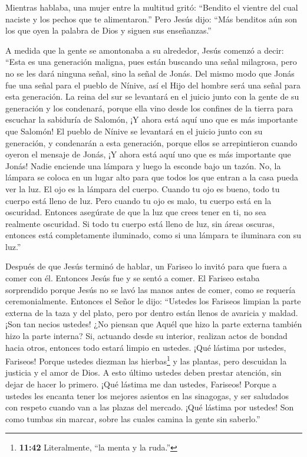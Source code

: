  Mientras hablaba, una mujer entre la multitud gritó:
``Bendito el vientre del cual naciste y los pechos que te alimentaron.''
 Pero Jesús dijo: ``Más benditos aún son los que oyen la
palabra de Dios y siguen sus enseñanzas.''

 A medida que la gente se amontonaba a su alrededor, Jesús
comenzó a decir: ``Esta es una generación maligna, pues están buscando
una señal milagrosa, pero no se les dará ninguna señal, sino la señal de
Jonás.  Del mismo modo que Jonás fue una señal para el
pueblo de Nínive, así el Hijo del hombre será una señal para esta
generación.  La reina del sur se levantará en el juicio
junto con la gente de su generación y los condenará, porque ella vino
desde los confines de la tierra para escuchar la sabiduría de Salomón,
¡Y ahora está aquí uno que es más importante que Salomón! 
El pueblo de Nínive se levantará en el juicio junto con su generación, y
condenarán a esta generación, porque ellos se arrepintieron cuando
oyeron el mensaje de Jonás, ¡Y ahora está aquí uno que es más importante
que Jonás!  Nadie enciende una lámpara y luego la esconde
bajo un tazón. No, la lámpara se coloca en un lugar alto para que todos
los que entran a la casa pueda ver la luz.  El ojo es la
lámpara del cuerpo. Cuando tu ojo es bueno, todo tu cuerpo está lleno de
luz. Pero cuando tu ojo es malo, tu cuerpo está en la oscuridad.
 Entonces asegúrate de que la luz que crees tener en ti, no
sea realmente oscuridad.  Si todo tu cuerpo está lleno de
luz, sin áreas oscuras, entonces está completamente iluminado, como si
una lámpara te iluminara con su luz.''

 Después de que Jesús terminó de hablar, un Fariseo lo
invitó para que fuera a comer con él. Entonces Jesús fue y se sentó a
comer.  El Fariseo estaba sorprendido porque Jesús no se
lavó las manos antes de comer, como se requería ceremonialmente.
 Entonces el Señor le dijo: ``Ustedes los Fariseos limpian
la parte externa de la taza y del plato, pero por dentro están llenos de
avaricia y maldad.  ¡Son tan necios ustedes! ¿No piensan
que Aquél que hizo la parte externa también hizo la parte interna?
 Si, actuando desde su interior, realizan actos de bondad
hacia otros, entonces todo estará limpio en ustedes.  ¡Qué
lástima por ustedes, Fariseos! Porque ustedes diezman las
hierbas\footnote{\textbf{11:42} Literalmente, ``la menta y la ruda.''} y
las plantas, pero descuidan la justicia y el amor de Dios. A esto último
ustedes deben prestar atención, sin dejar de hacer lo primero.
 ¡Qué lástima me dan ustedes, Fariseos! Porque a ustedes
les encanta tener los mejores asientos en las sinagogas, y ser saludados
con respeto cuando van a las plazas del mercado.  ¡Qué
lástima por ustedes! Son como tumbas sin marcar, sobre las cuales camina
la gente sin saberlo.''

